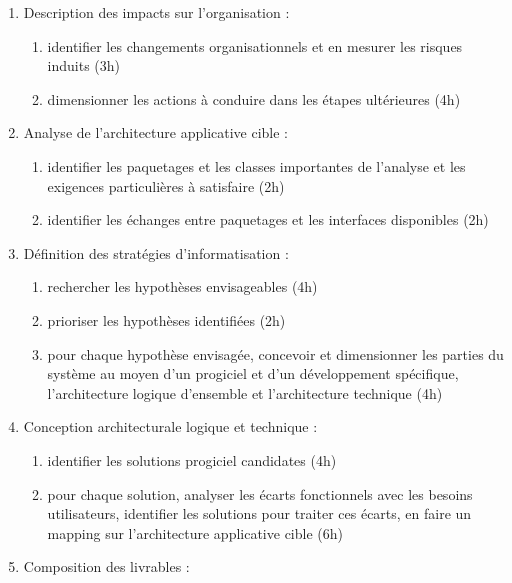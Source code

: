 \begin{enumerate}
          \begin{enumerate}
            \item Description des impacts sur l'organisation : 
                \begin{enumerate}
                  \item identifier les changements organisationnels et en mesurer les risques induits (3h)
                  \item dimensionner les actions à conduire dans les étapes ultérieures (4h)
                \end{enumerate}
            \item Analyse de l'architecture applicative cible : 
                \begin{enumerate}
                  \item identifier les paquetages et les classes importantes de l'analyse et les exigences particulières à satisfaire (2h)
                  \item identifier les échanges entre paquetages et les interfaces disponibles (2h)
                \end{enumerate}
            \item Définition des stratégies d'informatisation : 
                \begin{enumerate}
                  \item rechercher les hypothèses envisageables (4h)
                  \item prioriser les hypothèses identifiées (2h)
                  \item pour chaque hypothèse envisagée, concevoir et dimensionner les parties du système au moyen d'un progiciel et d'un développement spécifique, l'architecture logique d'ensemble et l'architecture technique (4h)
                \end{enumerate}
            \item Conception architecturale logique et technique : 
                \begin{enumerate}
                  \item identifier les solutions progiciel candidates (4h)
                  \item pour chaque solution, analyser les écarts fonctionnels avec les besoins utilisateurs, identifier les solutions pour traiter ces écarts, en faire un mapping sur l'architecture applicative cible (6h)
                \end{enumerate}
            \item Composition des livrables : 

\end{enumerate}
\end{enumerate}
